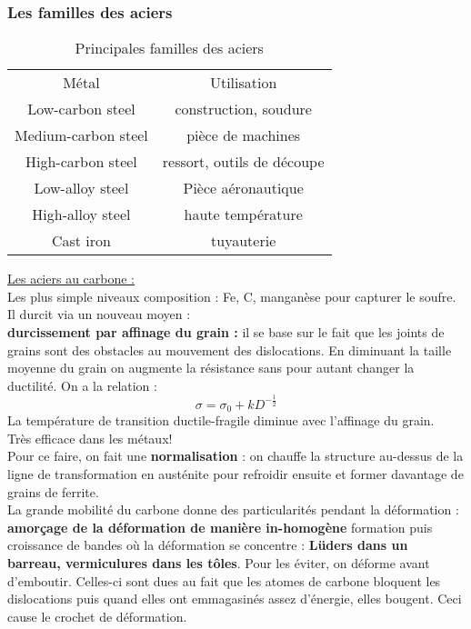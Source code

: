 \documentclass[../main.tex]{subfiles}
\begin{document}
\subsubsection{Les familles des aciers}
\begin{table}[hbt!]
    \centering
    \begin{tabular}{||c|c|}
    \hline
        Métal & Utilisation \\
        Low-carbon steel & construction, soudure\\
        Medium-carbon steel & pièce de machines\\
        High-carbon steel & ressort, outils de découpe\\
        Low-alloy steel & Pièce aéronautique \\
        High-alloy steel & haute température\\
        Cast iron & tuyauterie\\
        \hline
    \end{tabular}
    \caption{Principales familles des aciers}
     
\end{table}

\quad \underline{Les aciers au carbone :}\\
Les plus simple niveaux composition : Fe, C, manganèse pour capturer le soufre.\\
Il durcit via un nouveau moyen :\\
\textbf{durcissement par affinage du grain :} il se base sur le fait que les joints de grains sont des obstacles au mouvement des dislocations. En diminuant la taille moyenne du grain on augmente la résistance sans pour autant changer la ductilité. On a la relation :\\
\begin{equation}
    \sigma = \sigma_0 + kD^{-\frac{1}{2}}
\end{equation}
La température de transition ductile-fragile diminue avec l'affinage du grain.\\
Très efficace dans les métaux!\\
Pour ce faire, on fait une \textbf{normalisation} : on chauffe la structure au-dessus de la ligne de transformation en austénite pour refroidir ensuite et former davantage de grains de ferrite.\\


La grande mobilité du carbone donne des particularités pendant la déformation : \\
\textbf{amorçage de la déformation de manière in-homogène} formation puis croissance de bandes où la déformation se concentre : \textbf{Lüders dans un barreau, vermiculures dans les tôles}. Pour les éviter, on déforme avant d'emboutir. Celles-ci sont dues au fait que les atomes de carbone bloquent les dislocations puis quand elles ont emmagasinés assez d'énergie, elles bougent. Ceci cause le crochet de déformation.\\
\end{document}
